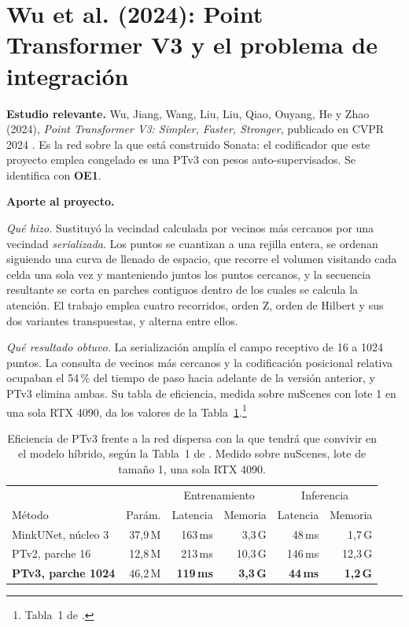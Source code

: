 \section[Point Transformer V3]{Wu et al. (2024): Point Transformer V3 y el
problema de integración}
\label{sec:ptv3}

\textbf{Estudio relevante.} Wu, Jiang, Wang, Liu, Liu, Qiao, Ouyang, He y Zhao
(2024), \emph{Point Transformer V3: Simpler, Faster, Stronger}, publicado en
CVPR 2024 \cite{wu2024ptv3}. Es la red sobre la que está construido Sonata: el
codificador que este proyecto emplea congelado es una PTv3 con pesos
auto-supervisados. Se identifica con \textbf{OE1}.

\textbf{Aporte al proyecto.}

\emph{Qué hizo.} Sustituyó la vecindad calculada por vecinos más cercanos por una
vecindad \emph{serializada}. Los puntos se cuantizan a una rejilla entera, se
ordenan siguiendo una curva de llenado de espacio, que recorre el volumen
visitando cada celda una sola vez y manteniendo juntos los puntos cercanos, y la
secuencia resultante se corta en parches contiguos dentro de los cuales se
calcula la atención. El trabajo emplea cuatro recorridos, orden Z, orden de
Hilbert y sus dos variantes transpuestas, y alterna entre ellos.

\emph{Qué resultado obtuvo.} La serialización amplía el campo receptivo de 16 a
1024 puntos. La consulta de vecinos más cercanos y la codificación posicional
relativa ocupaban el 54\,\% del tiempo de paso hacia adelante de la versión
anterior, y PTv3 elimina ambas. Su tabla de eficiencia, medida sobre nuScenes con
lote 1 en una sola RTX 4090, da los valores de la
Tabla~\ref{tab:eficiencia-ptv3}.\footnote{Tabla~1 de \cite{wu2024ptv3}.}

\begin{table}[htbp]
\centering
\caption{Eficiencia de PTv3 frente a la red dispersa con la que tendrá que
convivir en el modelo híbrido, según la Tabla~1 de \cite{wu2024ptv3}. Medido
sobre nuScenes, lote de tamaño 1, una sola RTX 4090.}
\label{tab:eficiencia-ptv3}
\begin{tabular}{@{}p{4.2cm}rrrrr@{}}
\hline
 & & \multicolumn{2}{c}{Entrenamiento} & \multicolumn{2}{c}{Inferencia} \\
Método & Parám. & Latencia & Memoria & Latencia & Memoria \\
\hline
MinkUNet, núcleo 3 & 37,9\,M & 163\,ms & 3,3\,G & 48\,ms & 1,7\,G \\
PTv2, parche 16 & 12,8\,M & 213\,ms & 10,3\,G & 146\,ms & 12,3\,G \\
\textbf{PTv3, parche 1024} & 46,2\,M & \textbf{119\,ms} & \textbf{3,3\,G} &
\textbf{44\,ms} & \textbf{1,2\,G} \\
\hline
\end{tabular}
\end{table}

